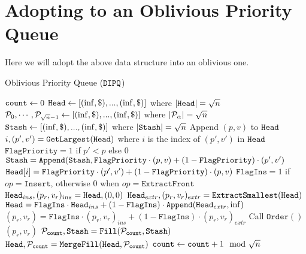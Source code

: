 \section{Adopting to an Oblivious Priority Queue}
Here we will adopt the above data structure into an oblivious one.

\newcommand{\DIPQOperation}{\texttt{Access}}
\newcommand{\experiment}{\textbf{Exp}}
\newcommand{\Append}{\texttt{Append}}
	
\begin{algorithm}
	\caption{Oblivious Priority Queue ($\texttt{DIPQ}$)}
	\label{alg:ObvQueue}
	\begin{algorithmic}[1]
		\Function{$\DIPQInit$}{}
		\State ${\texttt{count}} \gets 0$
		\State $\texttt{Head} \gets [(\inf, \$), ..., (\inf, \$)]$ where $|\texttt{Head}| = {\sqrt{n}}$
		\State $\mathcal{P}_0, \cdots, \mathcal{P}_{{\sqrt{n}}-1} \gets [(\inf, \$), ..., (\inf, \$)]$ where $|\mathcal{P}_\alpha| = {\sqrt{n}}$
		\State $\texttt{Stash} \gets [(\inf, \$), ..., (\inf, \$)]$ where $|\texttt{Stash}| = {\sqrt{n}}$
		\EndFunction
		\Function{$\DIPQOperation$}{$p, v, op$}
			\State Append $(p, v)$ to $\texttt{Head}$
			\State $i, (p', v') = \texttt{GetLargest}(\texttt{Head})$ where $i$ is the index of $(p', v')$ in $\texttt{Head}$
			\State $\texttt{FlagPriority} = 1$ if $p' < p$ else $0$
			\State $\DIPQstash =  \Append(\DIPQstash, \texttt{FlagPriority} \cdot (p, v) + (1 - \texttt{FlagPriority}) \cdot (p', v')$
			\State $\texttt{Head}[i] = \texttt{FlagPriority} \cdot (p', v') + (1 - \texttt{FlagPriority}) \cdot (p, v)$
			\State $\texttt{FlagIns} = 1$ if $op = \texttt{Insert}$, otherwise $0$ when $op = \texttt{ExtractFront}$
			\State $\texttt{Head}_{ins}, (p_r, v_r)_{ins} =  \texttt{Head}, (0, 0)$
			\State $\texttt{Head}_{extr}, (p_r, v_r)_{extr} =  \texttt{ExtractSmallest}(\texttt{Head})$
			\State $\DIPQhead = \texttt{FlagIns} \cdot \DIPQhead_{ins} + (1 - \texttt{FlagIns}) \cdot \Append(\DIPQhead_{extr}, \inf)$
			\State $(p_r, v_r) = \texttt{FlagIns} \cdot (p_r, v_r)_{ins} + (1 - \texttt{FlagIns}) \cdot (p_r, v_r)_{extr}$
			\State Call $\texttt{Order}()$ \label{algline:ObvPQOrderOp}
			\State \Return $(p_r, v_r)$
		\EndFunction
		\Function{$\DIPQOrder$}{}
			\State $\mathcal{P}_{{\texttt{count}}}, \texttt{Stash} = \texttt{Fill}(\mathcal{P}_{\texttt{count}}, \texttt{Stash})$
			\State $\texttt{Head}, \mathcal{P}_{\texttt{count}} = \texttt{MergeFill}(\texttt{Head}, \mathcal{P}_{\texttt{count}})$
			\State ${\texttt{count}} \gets {\texttt{count}} + 1 \mod {{\sqrt{n}}}$
		\EndFunction
	\end{algorithmic}
\end{algorithm}


